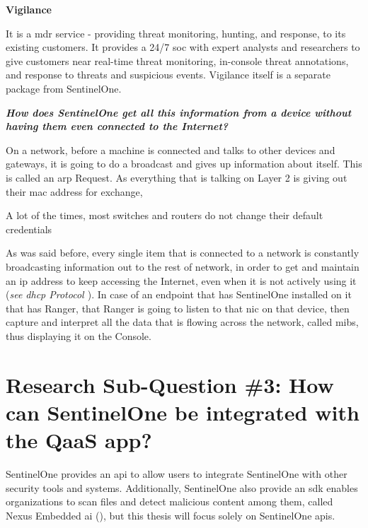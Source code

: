 \begin{multicols}{2}
      \textbf{Vigilance}

      It is a \acrshort{mdr} service - providing threat monitoring, hunting, and response, to its existing customers. It
      provides a 24/7 \acrshort{soc} with expert analysts and researchers to give customers near real-time threat monitoring,
      in-console threat annotations, and response to threats and suspicious events. Vigilance itself is a separate package from
      SentinelOne.

      \textbf{\textit{How does SentinelOne get all this information from a device without having them even connected to the Internet?}}

      On a network, before a machine is connected and talks to other devices
      and gateways, it is going to do a broadcast and gives up information about itself. This is called an \acrshort{arp} Request.
      As everything that is talking on Layer 2 is giving out their \acrshort{mac} address for exchange,

      A lot of the times, most switches and routers do not change their default credentials

      As was said before, every single item that is connected to a network is constantly broadcasting information out to the rest of
      network, in order to get and maintain an \acrshort{ip} address to keep accessing the Internet, even when it is not actively using
      it (\textit{see \acrshort{dhcp} Protocol \cite{dhcpProcess}}). In case of an endpoint that has SentinelOne installed on it that
      has Ranger, that Ranger is going to listen to that \acrshort{nic} on that device, then capture and interpret all the data that
      is flowing across the network, called \acrshort{mib}s, thus displaying it on the Console.

      \section{Research Sub-Question \#3: How can SentinelOne be integrated with the QaaS app?}

      SentinelOne provides an \acrshort{api} to allow users to integrate SentinelOne with other security tools and systems. Additionally,
      SentinelOne also provide an \acrshort{sdk} enables organizations to scan files and detect malicious content among them, called
      Nexus Embedded \acrshort{ai} (\textit{\cite{nexusSDK}}), but this thesis will focus solely on SentinelOne \acrshort{api}s.


\end{multicols}
